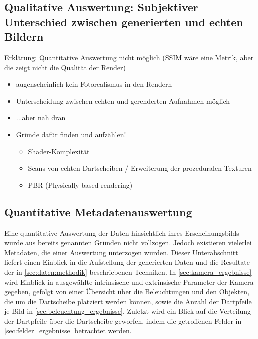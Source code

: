 \subsection{Qualitative Auswertung: Subjektiver Unterschied zwischen generierten und echten Bildern}  %
\label{sec:rendering_qualitativ}

Erklärung: Quantitative Auswertung nicht möglich (SSIM wäre eine Metrik, aber die zeigt nicht die Qualität der Render)

\begin{itemize}
    \item augenscheinlich kein Fotorealismus in den Rendern
    \item Unterscheidung zwischen echten und gerenderten Aufnahmen möglich
    \item ...aber nah dran
    \item Gründe dafür finden und aufzählen!
          \begin{itemize}
              \item Shader-Komplexität
              \item Scans von echten Dartscheiben / Erweiterung der prozeduralen Texturen
              \item PBR (Physically-based rendering)
          \end{itemize}
\end{itemize}


\subsection{Quantitative Metadatenauswertung}
\label{sec:metadaten}

Eine quantitative Auswertung der Daten hinsichtlich ihres Erscheinungsbilds wurde aus bereits genannten Gründen nicht vollzogen. Jedoch existieren vielerlei Metadaten, die einer Auswertung unterzogen wurden. Dieser Unterabschnitt liefert einen Einblick in die Aufstellung der generierten Daten und die Resultate der in \autoref{sec:daten:methodik} beschriebenen Techniken. In \autoref{sec:kamera_ergebnisse} wird Einblick in ausgewählte intrinsische und extrinsische Parameter der Kamera gegeben, gefolgt von einer Übersicht über die Beleuchtungen und den Objekten, die um die Dartscheibe platziert werden können, sowie die Anzahl der Dartpfeile je Bild in \autoref{sec:beleuchtung_ergebnisse}. Zuletzt wird ein Blick auf die Verteilung der Dartpfeile über die Dartscheibe geworfen, indem die getroffenen Felder in \autoref{sec:felder_ergebnisse} betrachtet werden.

